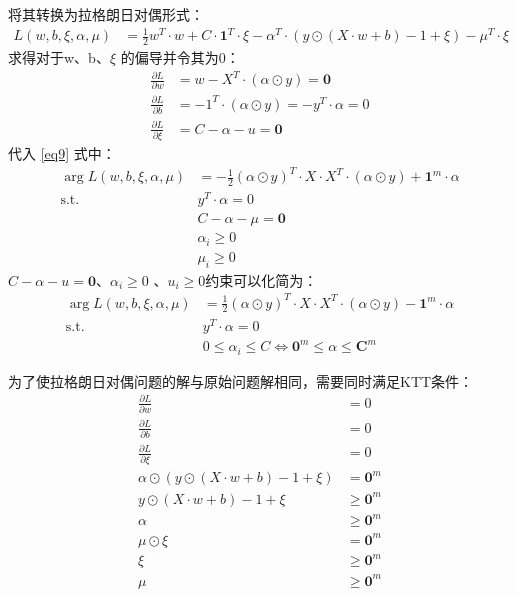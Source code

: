 \documentclass[12pt, a4paper, oneside]{ctexart}
\begin{document}
将其转换为拉格朗日对偶形式：
\begin{align}
    L(w, b, \xi, {\alpha}, \mu ) &= \frac{1}{2}w^T \cdot w + C \cdot {\boldsymbol{1}^T} \cdot \xi  - {\alpha} ^T \cdot  (y \odot (X \cdot w + b) - 1 + \xi) - \mu^T \cdot \xi  \label{eq9} 
\end{align}
求得对于w、b、$\xi$ 的偏导并令其为0：
\begin{align}
    \frac{\partial L}{\partial w} &= w - X^T\cdot(\alpha \odot y) = \boldsymbol{0} \nonumber \\
    \frac{\partial L}{\partial b} &= - 1^T\cdot(\alpha \odot y) = - y^T \cdot \alpha = 0  \nonumber \\
    \frac{\partial L}{\partial \xi} &= C - \alpha - u  = \boldsymbol{0} \nonumber 
\end{align}
代入 \eqref{eq9} 式中： 
\begin{align}
    \mathop{\arg\max_{\alpha}}  L(w, b, \xi, {\alpha}, \mu) &= -\frac{1}{2}(\alpha \odot y)^T \cdot X \cdot X^T \cdot (\alpha \odot y) + \boldsymbol{1}^m \cdot \alpha \nonumber \\
    \mathrm{ s.t. }\ \   &y^T \cdot \alpha = 0 \nonumber \\
    &C - \alpha - \mu \nonumber  = \boldsymbol{0} \nonumber \\
    &\alpha_i \geq 0 \nonumber \\
    &\mu_i \geq 0 \nonumber 
\end{align}
$C - \alpha - u   = \boldsymbol{0} $、$ \alpha_i \geq 0 $ 、$u_i \geq 0 $约束可以化简为：
\begin{align}
    \mathop{\arg\min_{\alpha}}  L(w, b, \xi, {\alpha}, \mu) &= \frac{1}{2}(\alpha \odot y)^T \cdot X \cdot X^T \cdot (\alpha \odot y) - \boldsymbol{1}^m \cdot \alpha \label{eq10}\\
    \mathrm{ s.t. }\ \   &y^T \cdot \alpha = 0 \nonumber \\
    & 0 \leq \alpha_i  \leq C  \iff \boldsymbol{0}^m \leq \alpha \leq \boldsymbol{C}^m \nonumber
\end{align}

为了使拉格朗日对偶问题的解与原始问题解相同，需要同时满足KTT条件：
\begin{align}
    \frac{\partial L}{\partial w} &= 0 \nonumber \\
    \frac{\partial L}{\partial b} &= 0 \nonumber \\
    \frac{\partial L}{\partial \xi} &= 0 \nonumber \\
    {\alpha} \odot  (y \odot (X \cdot w + b) - 1 + \xi) &= \boldsymbol{0}^m \nonumber \\
    y \odot (X \cdot w + b) - 1  + \xi &\geq \boldsymbol{0}^m \nonumber \\
    {\alpha} &\geq \boldsymbol{0}^m  \nonumber \\
    \mu \odot \xi &=  \boldsymbol{0}^m \nonumber \\
    \xi &\geq \boldsymbol{0}^m  \nonumber \\
    \mu &\geq \boldsymbol{0}^m  \nonumber 
\end{align}
\end{document}
